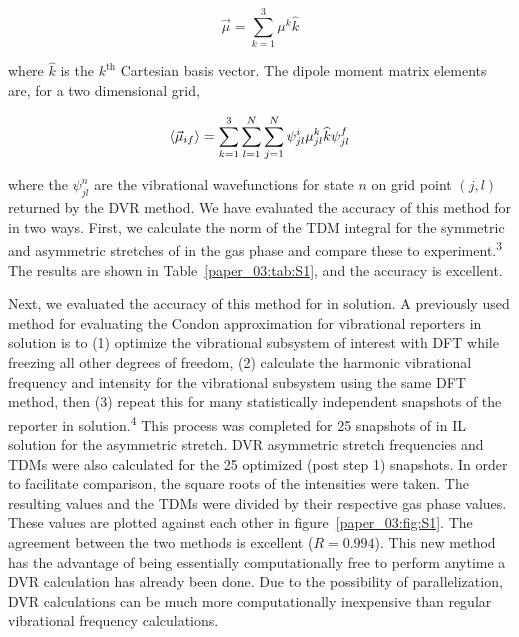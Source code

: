 \documentclass[]{article}
\begin{document}
\begin{equation}
  \label{paper_03:eq:S2}
  \vec{\mu} = \sum_{k = 1}^{3} \mu^k \widehat{k}
\end{equation}

where \(\widehat{k}\) is the \(k^{\text{th}}\) Cartesian basis vector. The dipole moment matrix elements are, for a two dimensional grid,

\begin{equation}
  \label{paper_03:eq:S3}
  \Braket{ \vec{\mu}_{if} } = \sum_{k = 1}^{3} \sum_{l = 1}^{N} \sum_{j = 1}^{N} \psi_{jl}^{i} \mu_{jl}^{k} \widehat{k} \psi_{jl}^{f}
\end{equation}

where the \(\psi_{jl}^{n}\) are the vibrational wavefunctions for state \(n\) on grid point \((j,l)\) returned by the DVR method. We have evaluated the accuracy of this method for  in two ways. First, we calculate the norm of the TDM integral for the symmetric and asymmetric stretches of  in the gas phase and compare these to experiment.\textsuperscript{3} The results are shown in Table~\ref{paper_03:tab:S1}, and the accuracy is excellent.

Next, we evaluated the accuracy of this method for  in solution. A previously used method for evaluating the Condon approximation for vibrational reporters in solution is to (1) optimize the vibrational subsystem of interest with DFT while freezing all other degrees of freedom, (2) calculate the harmonic vibrational frequency and intensity for the vibrational subsystem using the same DFT method, then (3) repeat this for many statistically independent snapshots of the reporter in solution.\textsuperscript{4} This process was completed for \num{25} snapshots of  in IL solution for the asymmetric stretch. DVR asymmetric stretch frequencies and TDMs were also calculated for the \num{25} optimized (post step 1) snapshots. In order to facilitate comparison, the square roots of the intensities were taken. The resulting values and the TDMs were divided by their respective gas phase values. These values are plotted against each other in figure~\ref{paper_03:fig:S1}. The agreement between the two methods is excellent (\(R = 0.994\)). This new method has the advantage of being essentially computationally free to perform anytime a DVR calculation has already been done. Due to the possibility of parallelization, DVR calculations can be much more computationally inexpensive than regular vibrational frequency calculations.
\end{document}
